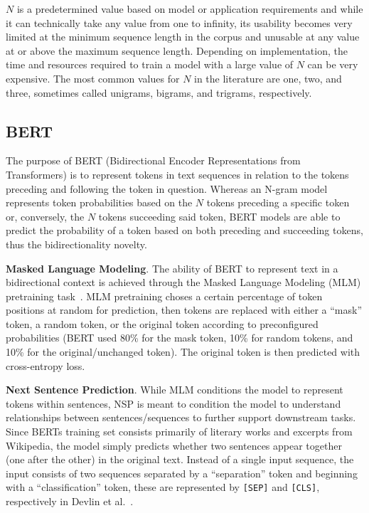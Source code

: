 \documentclass[12pt]{article}
\begin{document}
$N$ is a predetermined value based on model or application requirements and while it can technically take any value from one to infinity, its
usability becomes very limited at the minimum sequence length in the corpus and unusable at any value at or above the maximum sequence length.
Depending on implementation, the time and resources required to train a model with a large value of $N$ can be very expensive. The most common values
for $N$ in the literature are one, two, and three, sometimes called unigrams, bigrams, and trigrams, respectively.

\subsection{BERT}\label{sec:bert}
The purpose of BERT (Bidirectional Encoder Representations from Transformers) is to represent tokens in text sequences in relation to the tokens
preceding and following the token in question. Whereas an N-gram model represents token probabilities based on the $N$ tokens preceding a specific
token or, conversely, the $N$ tokens succeeding said token, BERT models are able to predict the probability of a token based on both preceding and
succeeding tokens, thus the bidirectionality novelty.

\textbf{Masked Language Modeling}. The ability of BERT to represent text in a bidirectional context is achieved through the Masked Language Modeling
(MLM) pretraining task~\cite{devlin_bert_2019}. MLM pretraining choses a certain percentage of token positions at random for prediction, then tokens
are replaced with either a ``mask'' token, a random token, or the original token according to preconfigured probabilities (BERT used 80\% for the mask
token, 10\% for random tokens, and 10\% for the original/unchanged token). The original token is then predicted with cross-entropy loss.

\textbf{Next Sentence Prediction}. While MLM conditions the model to represent tokens within sentences, NSP is meant to condition the model to
understand relationships between sentences/sequences to further support downstream tasks. Since BERTs training set consists primarily of literary
works and excerpts from Wikipedia, the  model simply predicts whether two sentences appear together (one after the other) in the original text.
Instead of a single input sequence, the input consists of two sequences separated by a ``separation'' token and beginning with a ``classification''
token, these are represented by \lstinline|[SEP]| and \lstinline|[CLS]|, respectively in Devlin et al.~\cite{devlin_bert_2019}.
\end{document}
